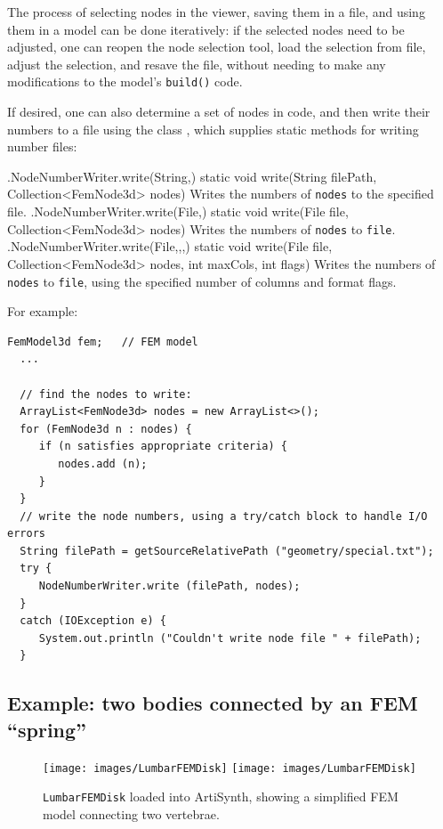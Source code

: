 The process of selecting nodes in the viewer, saving them in a file,
and using them in a model can be done iteratively: if the selected
nodes need to be adjusted, one can reopen the node selection tool, load the
selection from file, adjust the selection, and resave the file,
without needing to make any modifications to the model's {\tt build()}
code.

If desired, one can also determine a set of nodes in code, and then
write their numbers to a file using the
class , which
supplies static methods for writing number files:
%
\begin{methodtable}[4pt]{0.45}{0.55}
\midline
\methodentry
{\fem.NodeNumberWriter.write(String,)}%
{static void write(\brh String filePath, Collection<FemNode3d> nodes)}%
{Writes the numbers of {\tt nodes} to the specified file.}%
%
\methodentry
{\fem.NodeNumberWriter.write(File,)}%
{static void write(\brh File file, Collection<FemNode3d> nodes)}%
{Writes the numbers of {\tt nodes} to {\tt file}.}%
%
\methodentry
{\fem.NodeNumberWriter.write(File,,,)}%
{static void write(\brh File file,
  Collection<FemNode3d> nodes, \brh int maxCols, int flags)}%
{Writes the numbers of {\tt nodes} to {\tt file}, using
the specified number of columns and format flags.}%
%
\midline
\end{methodtable}
%
For example:
%
\begin{lstlisting}[]
  FemModel3d fem;   // FEM model
  ...

  // find the nodes to write:
  ArrayList<FemNode3d> nodes = new ArrayList<>();
  for (FemNode3d n : nodes) {
     if (n satisfies appropriate criteria) {
        nodes.add (n);
     }
  }
  // write the node numbers, using a try/catch block to handle I/O errors
  String filePath = getSourceRelativePath ("geometry/special.txt");
  try {
     NodeNumberWriter.write (filePath, nodes);
  }
  catch (IOException e) {
     System.out.println ("Couldn't write node file " + filePath);
  }
\end{lstlisting}
%

\subsection{Example: two bodies connected by an FEM ``spring''}
\label{sec:fem:LumarFEMDisk}

\begin{figure}[h]
\begin{center}
\iflatexml
 \texttt{[image: images/LumbarFEMDisk]}
\else
 \texttt{[image: images/LumbarFEMDisk]}
\fi
\end{center}
\caption{{\tt LumbarFEMDisk} loaded into ArtiSynth, showing
a simplified FEM model connecting two vertebrae.}
\label{LumbarFEMDisk:fig}
\end{figure}

